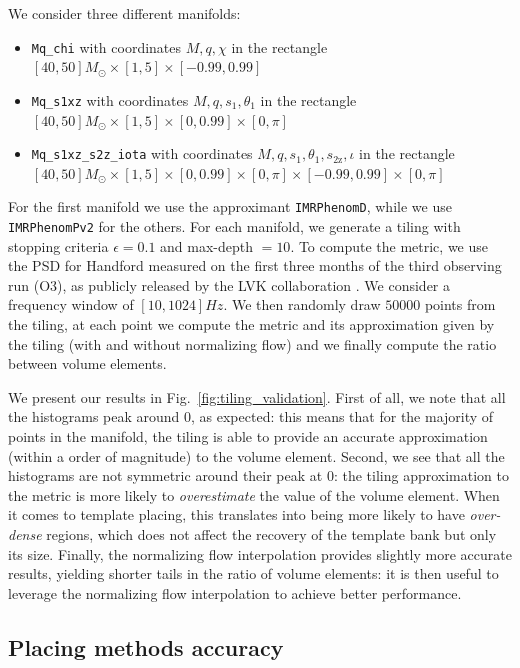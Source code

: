 \documentclass[twocolumn,showpacs,preprintnumbers,nofootinbib,prd,
superscriptaddress,10pt]{revtex4-2}
\begin{document}
We consider three different manifolds:
\begin{itemize}
	\item \texttt{Mq\_chi} with coordinates $M, q, \chi $ in the rectangle $[40, 50] M_\odot \times [1,5] \times [-0.99, 0.99]$
	\item \texttt{Mq\_s1xz} with coordinates $M, q, s_{1}, \theta_1$ in the rectangle $[40, 50] M_\odot \times [1,5] \times [0, 0.99] \times [0,\pi]$
	\item \texttt{Mq\_s1xz\_s2z\_iota} with coordinates $M, q, s_{1}, \theta_1, s_\text{2z}, \iota$ in the rectangle $[40, 50] M_\odot \times [1,5] \times [0, 0.99] \times [0,\pi] \times [-0.99, 0.99] \times [0, \pi]$
\end{itemize}
For the first manifold we use the approximant \texttt{IMRPhenomD}, while we use \texttt{IMRPhenomPv2} for the others.
For each manifold, we generate a tiling with stopping criteria $\epsilon = 0.1$ and max-depth $= 10$.
To compute the metric, we use the PSD for Handford measured on the first three months of the third observing run (O3), as publicly released by the LVK collaboration \cite{O3a_PSDs}. We consider a frequency window of $[10, 1024]Hz$.
We then randomly draw $50000$ points from the tiling, at each point we compute the metric and its approximation given by the tiling (with and without normalizing flow) and we finally compute the ratio between volume elements.

We present our results in Fig.~\ref{fig:tiling_validation}.
First of all, we note that all the histograms peak around $0$, as expected: this means that for the majority of points in the manifold, the tiling is able to provide an accurate approximation (within a order of magnitude) to the volume element.
Second, we see that all the histograms are not symmetric around their peak at $0$: the tiling approximation to the metric is more likely to {\it overestimate} the value of the volume element. When it comes to template placing, this translates into being more likely to have {\it over-dense} regions, which does not affect the recovery of the template bank but only its size.
Finally, the normalizing flow interpolation provides slightly more accurate results, yielding shorter tails in the ratio of volume elements: it is then useful to leverage the normalizing flow interpolation to achieve better performance.


\subsection{Placing methods accuracy} \label{sec:placing_accuracy}
\end{document}
